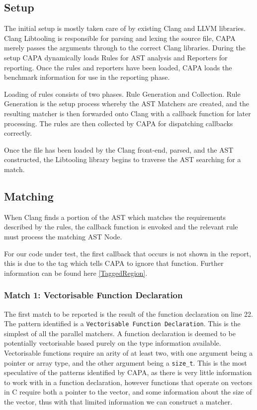 \subsection{Setup}
The initial setup is mostly taken care of by existing Clang and LLVM libraries. Clang Libtooling is
responsible for parsing and lexing the source file, CAPA merely passes the arguments through to the
correct Clang libraries. During the setup CAPA dynamically loads Rules for AST analysis and
Reporters for reporting. Once the rules and reporters have been loaded, CAPA loads the benchmark
information for use in the reporting phase.

Loading of rules consists of two phases. Rule Generation and Collection. Rule Generation is the
setup process whereby the AST Matchers are created, and the resulting matcher is then forwarded onto
Clang with a callback function for later processing. The rules are then collected by CAPA for
dispatching callbacks correctly.

Once the file has been loaded by the Clang front-end, parsed, and the AST constructed, the
Libtooling library begins to traverse the AST searching for a match.

\subsection{Matching}
When Clang finds a portion of the AST which matches the requirements described by the rules, the
callback function is envoked and the relevant rule must process the matching AST Node.

For our code under test, the first callback that occurs is not shown in the report, this is due to
the tag which tells CAPA to ignore that function. Further information can be found here
\ref{TaggedRegion}.

\subsubsection{Match 1: Vectorisable Function Declaration}
The first match to be reported is the result of the function declaration on line 22. The pattern
identified is a \lstinline{Vectorisable Function Declaration}. This is the simplest of all the
parallel matchers. A function declaration is deemed to be potentially vectorisable based purely on
the type information available. Vectorisable functions require an arity of at least two, with one
argument being a pointer or array type, and the other argument being a \lstinline{size_t}. This is the
most speculative of the patterns identified by CAPA, as there is very little information to work
with in a function declaration, however functions that operate on vectors in C require both a
pointer to the vector, and some information about the size of the vector, thus with that limited
information we can construct a matcher.

